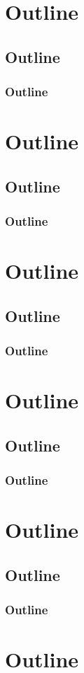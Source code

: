 \documentclass[
    aspectratio=169
]{beamer}
\begin{document}
\section{Outline}
\subsection{Outline}
\begin{frame}
\frametitle{Outline}
\end{frame}
\section{Outline}
\subsection{Outline}
\begin{frame}
\frametitle{Outline}
\end{frame}
\section{Outline}
\subsection{Outline}
\begin{frame}
\frametitle{Outline}
\end{frame}
\section{Outline}
\subsection{Outline}
\begin{frame}
\frametitle{Outline}
\end{frame}
\section{Outline}
\subsection{Outline}
\begin{frame}
\frametitle{Outline}
\end{frame}
\section{Outline}
\end{document}
